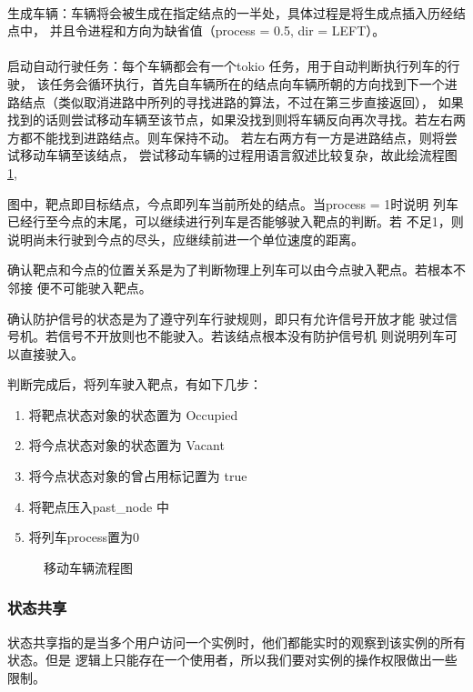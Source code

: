 \paragraph{}生成车辆：车辆将会被生成在指定结点的一半处，具体过程是将生成点插入历经结点中，
并且令进程和方向为缺省值（process = 0.5, dir = LEFT）。

\paragraph{}启动自动行驶任务：每个车辆都会有一个tokio 任务，用于自动判断执行列车的行驶，
该任务会循环执行，首先自车辆所在的结点向车辆所朝的方向找到下一个进路结点（类似取消进路中所列的寻找进路的算法，不过在第三步直接返回），
如果找到的话则尝试移动车辆至该节点，如果没找到则将车辆反向再次寻找。若左右两方都不能找到进路结点。则车保持不动。
若左右两方有一方是进路结点，则将尝试移动车辆至该结点，
尝试移动车辆的过程用语言叙述比较复杂，故此绘流程图 \ref{tmf},

图中，靶点即目标结点，今点即列车当前所处的结点。当process = 1时说明
列车已经行至今点的末尾，可以继续进行列车是否能够驶入靶点的判断。若
不足1，则说明尚未行驶到今点的尽头，应继续前进一个单位速度的距离。

确认靶点和今点的位置关系是为了判断物理上列车可以由今点驶入靶点。若根本不邻接
便不可能驶入靶点。

确认防护信号的状态是为了遵守列车行驶规则，即只有允许信号开放才能
驶过信号机。若信号不开放则也不能驶入。若该结点根本没有防护信号机
则说明列车可以直接驶入。

判断完成后，将列车驶入靶点，有如下几步：

\begin{enumerate}
    \item 将靶点状态对象的状态置为 Occupied
    \item 将今点状态对象的状态置为 Vacant
    \item 将今点状态对象的曾占用标记置为 true
    \item 将靶点压入past\_node 中
    \item 将列车process置为0
\end{enumerate}

\begin{figure}[htbp!]
    \centering
    
    \caption{\label{tmf}移动车辆流程图}
\end{figure}

\subsubsection{状态共享}
状态共享指的是当多个用户访问一个实例时，他们都能实时的观察到该实例的所有状态。但是
逻辑上只能存在一个使用者，所以我们要对实例的操作权限做出一些限制。

